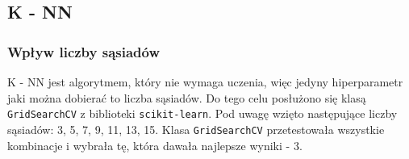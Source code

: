 \subsection{K - NN}\label{subsec:dobor_hiperparametrow_knn}
\subsubsection{Wpływ liczby sąsiadów}\label{subsubsec:liczba_sasiadow}
K - NN jest algorytmem, który nie wymaga uczenia, więc jedyny hiperparametr jaki można dobierać to liczba sąsiadów.
Do tego celu posłużono się klasą \texttt{GridSearchCV} z biblioteki \texttt{scikit-learn}.
Pod uwagę wzięto następujące liczby sąsiadów: 3, 5, 7, 9, 11, 13, 15. Klasa \texttt{GridSearchCV}
przetestowała wszystkie kombinacje i wybrała tę, która dawała najlepsze wyniki - 3.